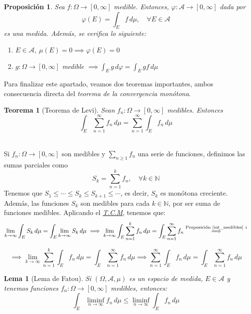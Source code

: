 \documentclass[11pt, a4paper]{article}
\makeatletter
\newif\IfInSansMode
\let\oldsf\sffamily
\renewcommand*{\sffamily}{\oldsf\mathversion{sans}\InSansModetrue}
\let\oldnorm\normalfont
\renewcommand*{\normalfont}{\oldnorm\InSansModefalse\mathversion{normal}}
\newcommand{\W}{\Omega}
\renewenvironment{proof}[1][\proofname] {\par\pushQED{\qed}\normalfont\topsep6\p@\@plus6\p@\relax\trivlist\item[\hskip\labelsep\itshape\sffamily#1\@addpunct{.}]\ignorespaces}{\popQED\endtrivlist\@endpefalse}
\theoremstyle{theorem-style}
\newtheorem{nth}{Teorema}[section]
\newtheorem{nprop}{Proposición}[section]
\newtheorem{lema}{Lema}[section]
\theoremstyle{definition-style}
\theoremstyle{remark-style}
\theoremstyle{example-style}
\newenvironment{nlist}
{\begin{enumerate}
    \renewcommand\labelenumi{(\emph{\roman{enumi})}}}
  {\end{enumerate}}
\makeatother
\begin{document}
\begin{nprop} \label {phi_2} Sea $f:\W \to [0,\infty]$ medible. Entonces, $\varphi:\mathscr A \to [0,\infty]$ dada por $$\varphi(E) = \int_E f\, d\mu, \quad \forall E \in \mathscr A$$
es una medida. Además, se verifica lo siguiente:
  \begin{nlist}
  \item $E\in \mathscr A, \ \mu(E) = 0 \implies \varphi(E) = 0$
  \item $g:\Omega \to [0,\infty]$ medible $\displaystyle \implies \int_E g\, d\varphi = \int_E g f\, d\mu$
  \end{nlist}
\end{nprop}

Para finalizar este apartado, veamos dos teoremas importantes, ambos consecuencia directa del \textit{teorema de la convergencia monótona}.

\begin{nth}[Teorema de Levi] Sean $f_n: \Omega \to [0,\infty]$ medibles. Entonces
\[
     \int_E \sum_{n=1}^\infty f_n\, d \mu = \sum_{n=1}^\infty \int_E f_n\, d\mu
  \]
\end{nth}

	  \begin{proof} \hfill \\
    Si $f_n:\Omega \to [0,\infty]$ son medibles y $\sum_{n\geq 1}f_n$ una serie de funciones, definimos las sumas parciales como
    \[
      S_k= \sum_{n=1}^k f_n, \quad \forall k \in \mathbb{N}
    \]
    Tenemos que $S_1 \leq \cdots \leq S_k \leq S_{k+1} \leq \cdots $, es decir, $S_k$ es monótona creciente. Además, las funciones $S_k$ son medibles para cada $k \in \mathbb{N}$, por ser suma de funciones medibles. Aplicando el \hyperref[tcm]{\textit{T.C.M}}, tenemos que:
    \[
      \lim_{k \to \infty} \int_E S_k\, d\mu = \int_E \lim_{k\to \infty} S_k\, d\mu \implies \lim_{k \to \infty} \int_E \sum_{n=1}^k f_n\, d\mu = \int_E \sum_{n=1}^\infty f_n \overset{\text{Proposición \ref {int_medibles}} \ i}\implies
    \]
    
    \[
    \implies \lim_{k\to\infty} \sum_{n=1}^k \int_E f_n\,d\mu = \int_E \sum_{n=1}^\infty f_n\,d\mu \implies \sum_{n=1}^\infty \int_E f_n\,d\mu = \int_E \sum_{n=1}^\infty f_n\,d\mu
    \]
\end{proof}

\begin{lema} [Lema de Fatou]
  Si $(\Omega,\mathscr A,\mu)$ es un espacio de medida, $E\in \mathscr A$ y tenemos funciones $f_n:\Omega \to [0,\infty]$ medibles, entonces:
  \[
    \int_E \liminf_{n \to \infty} f_n\, d\mu \leq \liminf_{n\to \infty} \int_E f_n\, d\mu
  \]
\end{lema}
\end{document}
